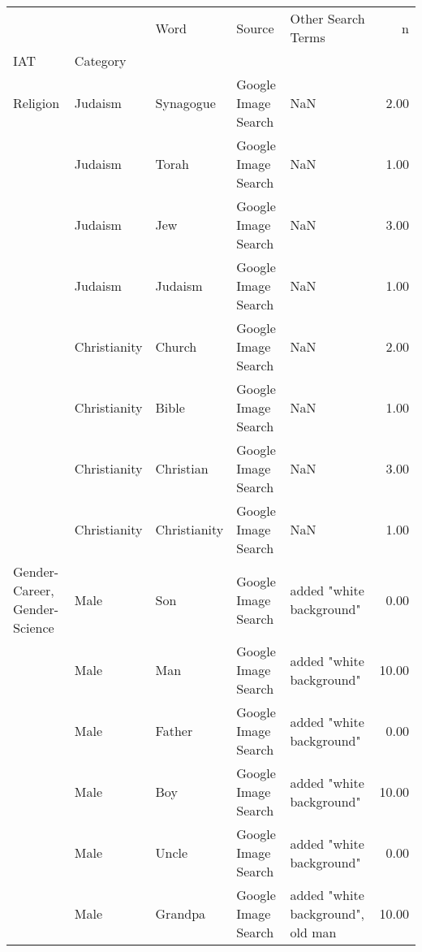 \begin{tabular}{lllllr}
\toprule
     &                   &               Word &               Source &                                 Other Search Terms &     n \\
IAT & Category &                    &                      &                                                    &       \\
\midrule
Religion & Judaism &          Synagogue &  Google Image Search &                                                NaN &  2.00 \\
     & Judaism &              Torah &  Google Image Search &                                                NaN &  1.00 \\
     & Judaism &                Jew &  Google Image Search &                                                NaN &  3.00 \\
     & Judaism &            Judaism &  Google Image Search &                                                NaN &  1.00 \\
     & Christianity &             Church &  Google Image Search &                                                NaN &  2.00 \\
     & Christianity &              Bible &  Google Image Search &                                                NaN &  1.00 \\
     & Christianity &          Christian &  Google Image Search &                                                NaN &  3.00 \\
     & Christianity &       Christianity &  Google Image Search &                                                NaN &  1.00 \\
Gender-Career, Gender-Science & Male &                Son &  Google Image Search &                           added "white background" &  0.00 \\
     & Male &                Man &  Google Image Search &                           added "white background" & 10.00 \\
     & Male &             Father &  Google Image Search &                           added "white background" &  0.00 \\
     & Male &                Boy &  Google Image Search &                           added "white background" & 10.00 \\
     & Male &              Uncle &  Google Image Search &                           added "white background" &  0.00 \\
     & Male &            Grandpa &  Google Image Search &                  added "white background", old man & 10.00 \\

\end{tabular}
